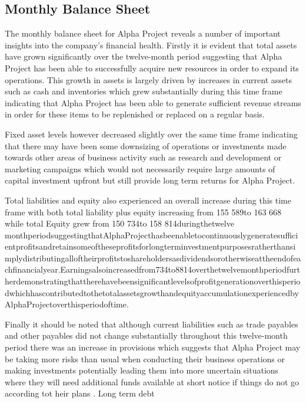 

\subsection{Monthly Balance Sheet}\label{sec:title}

The monthly balance sheet for Alpha Project reveals a number of important insights into the company's financial health. Firstly it is evident that total assets have grown significantly over the twelve-month period suggesting that Alpha Project has been able to successfully acquire new resources in order to expand its operations. This growth in assets is largely driven by increases in current assets such as cash and inventories which grew substantially during this time frame indicating that Alpha Project has been able to generate sufficient revenue streams in order for these items to be replenished or replaced on a regular basis. 

Fixed asset levels however decreased slightly over the same time frame indicating that there may have been some downsizing of operations or investments made towards other areas of business activity such as research and development or marketing campaigns which would not necessarily require large amounts of capital investment upfront but still provide long term returns for Alpha Project. 

Total liabilities and equity also experienced an overall increase during this time frame with both total liability plus equity increasing from 155 589to 163 668 while total Equity grew from 150 734to 158 814duringthetwelve monthperiodsuggestingthatAlphaProjecthasbeenabletocontinuouslygeneratesufficientprofitsandretainsomeoftheseprofitsforlongterminvestmentpurposesratherthansimplydistributingalloftheirprofitstoshareholdersasdividendsorotherwiseattheendofeachfinancialyear.Earningsalsoincreasedfrom734to8814overthetwelvemonthperiodfurtherdemonstratingthattherehavebeensignificantlevelsofprofitgenerationoverthisperiodwhichhascontributedtothetotalassetsgrowthandequityaccumulationexperiencedbyAlphaProjectoverthisperiodoftime. 

Finally it should be noted that although current liabilities such as trade payables and other payables did not change substantially throughout this twelve-month period there was an increase in provisions which suggests that Alpha Project may be taking more risks than usual when conducting their business operations or making investments potentially leading them into more uncertain situations where they will need additional funds available at short notice if things do not go according tot heir plans . Long term debt